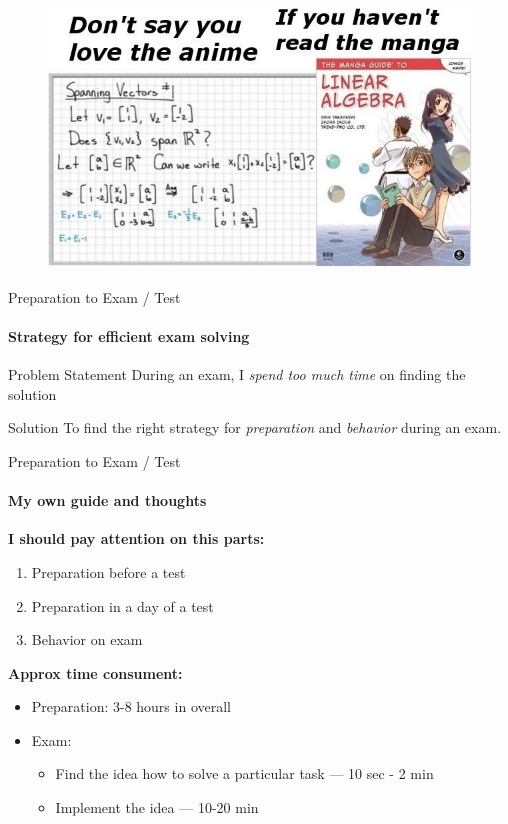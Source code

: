 \documentclass[aspectratio=169,notes]{beamer}
\begin{document}
\begin{frame}[t]{}
    \framesubtitle{}
    \begin{figure}[H]
        \centering\includegraphics[height=7cm,width=1\textwidth,keepaspectratio]{agla_manga.jpeg}
        \label{fig:agla_manga.jpeg}
    \end{figure}
\end{frame}


\begin{frame}[t]{Preparation to Exam / Test}
    \framesubtitle{Strategy for efficient exam solving}
    \begin{exampleblock}{Problem Statement}
        During an exam, I \textit{spend too much time} on finding the solution
    \end{exampleblock}
    \begin{alertblock}{Solution}
        To find the right strategy for \textit{preparation} and \textit{behavior} during an exam.
    \end{alertblock}
\end{frame}

\begin{frame}[t]{Preparation to Exam / Test}
    \framesubtitle{My own guide and thoughts}
    \textbf{ I should pay attention on this parts:}
    \begin{enumerate}
        \item Preparation before a test
        \item Preparation in a day of a test
        \item Behavior on exam
    \end{enumerate}

    \textbf{Approx time consument:}
    \begin{itemize}
        \item Preparation: 3-8 hours in overall
        \item Exam: \begin{itemize}
                  \item Find the idea how to solve a particular task --- 10 sec - 2 min
                  \item Implement the idea — 10-20 min
              \end{itemize}
    \end{itemize}
\end{frame}
\end{document}
